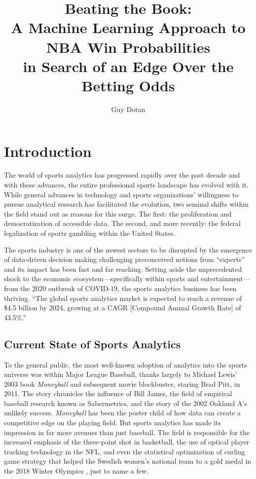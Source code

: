 \documentclass [MS] {uclathes}
\title          {Beating the Book: \\
                A Machine Learning Approach to NBA Win Probabilities \\
                in Search of an Edge Over the Betting Odds}
\author         {Guy Dotan}
\begin{document}
\makeintropages

%
%

\chapter{Introduction}

The world of sports analytics has progressed rapidly over the past decade and with these advances, the entire professional sports landscape has evolved with it. While general advances in technology and sports organizations' willingness to pursue analytical research has facilitated the evolution, two seminal shifts within the field stand out as reasons for this surge. The first: the proliferation and democratization of accessible data. The second, and more recently: the federal legalization of sports gambling within the United States.

The sports industry is one of the newest sectors to be disrupted by the emergence of data-driven decision making challenging preconceived notions from ``experts'' and its impact has been fast and far reaching. Setting aside the unprecedented shock to the economic ecosystem---specifically within sports and entertainment---from the 2020 outbreak of COVID-19, the sports analytics business has been thriving. ``The global sports analytics market is expected to reach a revenue of \$4.5 billion by 2024, growing at a CAGR [Compound Annual Growth Rate] of 43.5\%.'' \cite{samf2024} 

\section{Current State of Sports Analytics}
To the general public, the most well-known adoption of analytics into the sports universe was within Major League Baseball, thanks largely to Michael Lewis' 2003 book \emph{Moneyball} and subsequent movie blockbuster, staring Brad Pitt, in 2011. The story chronicles the influence of Bill James, the field of empirical baseball research known as Sabermetrics, and the story of the 2002 Oakland A's unlikely success. \emph{Moneyball} has been the poster child of how data can create a competitive edge on the playing field. But sports analytics has made its impression in far more avenues than just baseball. The field is responsible for the increased emphasis of the three-point shot in basketball, the use of optical player tracking technology in the NFL, and even the statistical optimization of curling game strategy that helped the Swedish women's national team to a gold medal in the 2018 Winter Olympics \cite{curling}, just to name a few. 
\end{document}
